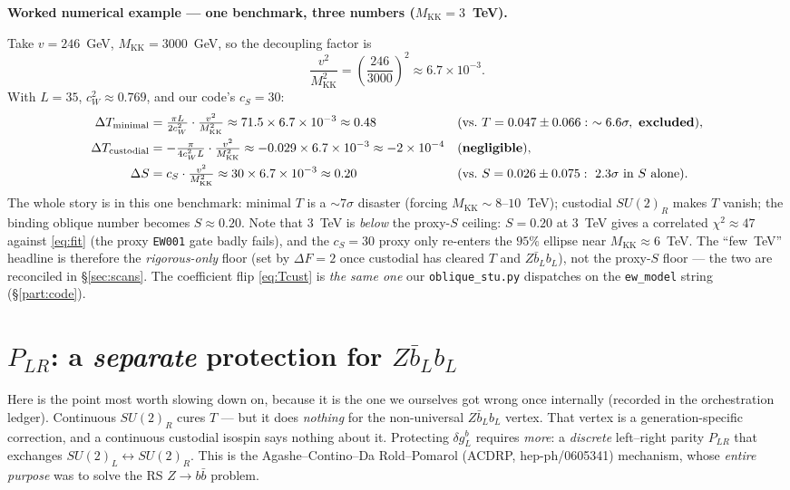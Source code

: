 \documentclass[11pt]{article}
\newenvironment{callout}[1]{%
  \par\medskip\begin{shaded}\noindent\textbf{#1}\par\smallskip}{\end{shaded}\medskip}
\newcommand{\MKK}{M_{\mathrm{KK}}}
\newcommand{\cwsq}{c_W^2}
\newcommand{\vev}{v}
\newcommand{\SUL}{SU(2)_L}
\newcommand{\SUR}{SU(2)_R}
\newcommand{\PLR}{P_{LR}}
\newcommand{\code}[1]{\texttt{#1}}
\newcommand{\dgL}{\delta g_L^b}
\theoremstyle{definition}
\begin{document}
\begin{callout}{Worked numerical example --- one benchmark, three numbers ($\MKK=3$~TeV).}
Take $\vev = 246$~GeV, $\MKK = 3000$~GeV, so the decoupling factor is
\[
\frac{\vev^2}{\MKK^2} = \left(\frac{246}{3000}\right)^2 \approx 6.7\times10^{-3}.
\]
With $L=35$, $\cwsq\approx0.769$, and our code's $c_S=30$:
\begin{align*}
\Delta T_{\rm minimal}  &= \tfrac{\pi L}{2\cwsq}\cdot\tfrac{\vev^2}{\MKK^2}
   \approx 71.5\times 6.7\times10^{-3} \approx 0.48
   &&(\text{vs.\ }T=0.047\pm0.066:\ \sim 6.6\sigma,\ \textbf{excluded}),\\
\Delta T_{\rm custodial} &= -\tfrac{\pi}{4\cwsq L}\cdot\tfrac{\vev^2}{\MKK^2}
   \approx -0.029\times 6.7\times10^{-3} \approx -2\times10^{-4}
   &&(\textbf{negligible}),\\
\Delta S &= c_S\cdot\tfrac{\vev^2}{\MKK^2}
   \approx 30\times 6.7\times10^{-3} \approx 0.20
   &&(\text{vs.\ }S=0.026\pm0.075:\ 2.3\sigma\text{ in }S\text{ alone}).
\end{align*}
The whole story is in this one benchmark: minimal $T$ is a $\sim 7\sigma$
disaster (forcing $\MKK\sim 8$--$10$~TeV); custodial $\SUR$ makes $T$ vanish; the
binding oblique number becomes $S\approx 0.20$. Note that $3$~TeV is \emph{below}
the proxy-$S$ ceiling: $S=0.20$ at $3$~TeV gives a correlated $\chi^2\approx 47$
against \eqref{eq:fit} (the proxy \code{EW001} gate badly fails), and the
$c_S=30$ proxy only re-enters the $95\%$ ellipse near $\MKK\approx 6$~TeV. The
``few~TeV'' headline is therefore the \emph{rigorous-only} floor (set by
$\Delta F=2$ once custodial has cleared $T$ and $Z\bar b_L b_L$), not the proxy-$S$
floor --- the two are reconciled in \S\ref{sec:scans}. The coefficient flip
\eqref{eq:Tcust} is \emph{the same one} our \code{oblique\_stu.py} dispatches on
the \code{ew\_model} string (\S\ref{part:code}).
\end{callout}

\section{$\PLR$: a \emph{separate} protection for $Z\bar b_L b_L$}
\label{sec:PLR}

Here is the point most worth slowing down on, because it is the one we ourselves
got wrong once internally (recorded in the orchestration ledger). Continuous
$\SUR$ cures $T$ --- but it does \emph{nothing} for the non-universal $Z\bar b_L
b_L$ vertex. That vertex is a generation-specific correction, and a continuous
custodial isospin says nothing about it. Protecting $\dgL$ requires \emph{more}: a
\emph{discrete} left--right parity $\PLR$ that exchanges
$\SUL\leftrightarrow\SUR$. This is the Agashe--Contino--Da Rold--Pomarol (ACDRP,
hep-ph/0605341) mechanism, whose \emph{entire purpose} was to solve the RS
$Z\to b\bar b$ problem.
\end{document}
